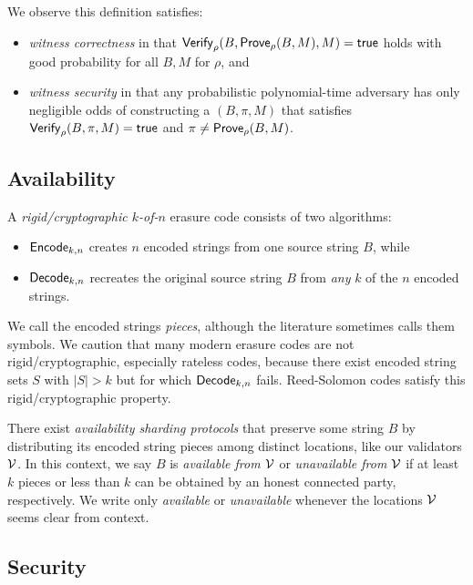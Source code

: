 We observe this definition satisfies:
\begin{itemize}
\item {\em witness correctness} in that $\mathsf{Verify}_{\rho}(B,\mathsf{Prove}_{\rho}(B,M),M) = \mathsf{true}$ holds with good probability for all $B,M$ for $\rho$, and
\item {\em witness security} in that 
any probabilistic polynomial-time adversary has only negligible odds of constructing a $(B,\pi,M)$ that satisfies $\mathsf{Verify}_{\rho}(B,\pi,M) = \mathsf{true}$ and $\pi \ne \mathsf{Prove}_{\rho}(B,M)$.
\end{itemize}

\subsection{Availability}

A {\em rigid/cryptographic $k$-of-$n$} erasure code consists of two algorithms:
\begin{itemize}
\item $\mathsf{Encode}_{k,n}$ creates $n$ encoded strings from one source string $B$, while
\item $\mathsf{Decode}_{k,n}$ recreates the original source string $B$ from {\em any} $k$ of the $n$ encoded strings.
\end{itemize}
We call the encoded strings {\em pieces}, although the literature sometimes calls them symbols.  We caution that many modern erasure codes are not rigid/cryptographic, especially rateless codes, because there exist encoded string sets $S$ with $|S| > k$ but for which $\mathsf{Decode}_{k,n}$ fails.  Reed-Solomon codes satisfy this rigid/cryptographic property.

There exist {\em availability sharding protocols} that preserve some string $B$ by distributing its encoded string pieces among distinct locations, like our validators $\mathcal{V}$.  In this context, we say $B$ is {\em available from $\mathcal{V}$} or {\em unavailable from $\mathcal{V}$} if at least $k$ pieces or less than $k$ can be obtained by an honest connected party, respectively.  We write only  {\em available} or {\em unavailable} whenever the locations $\mathcal{V}$ seems clear from context.


\subsection{Security}

